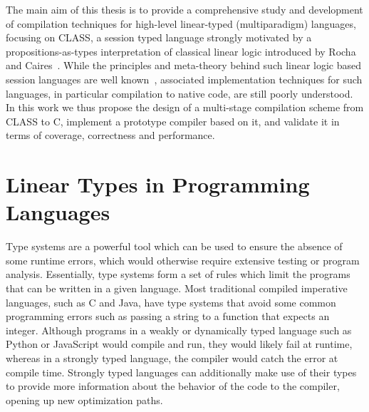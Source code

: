 \label{chap:intro}

The main aim of this thesis is to provide a comprehensive study and development of compilation techniques for high-level linear-typed (multiparadigm) languages, focusing on CLASS, a session typed language strongly motivated by a propositions-as-types interpretation of classical linear logic introduced by Rocha and Caires~\cite{Rocha:2021,Rocha:2023,Rocha:2022}. While the principles and meta-theory behind such linear logic based session languages are well known~\cite{Caires:2016,Wadler:2012}, associated implementation techniques for such languages, in particular compilation to native code, are still poorly understood. In this work we thus propose the design of a multi-stage compilation scheme from CLASS to C, implement a prototype compiler based on it, and validate it in terms of coverage, correctness and performance. 



\section{Linear Types in Programming Languages}

Type systems are a powerful tool which can be used to ensure the absence of some runtime errors, which would otherwise require extensive testing or program analysis. Essentially, type systems form a set of rules which limit the programs that can be written in a given language. Most traditional compiled imperative languages, such as C and Java, have type systems that avoid some common programming errors such as passing a string to a function that expects an integer. Although programs in a weakly or dynamically typed language such as Python or JavaScript would compile and run, they would likely fail at runtime, whereas in a strongly typed language, the compiler would catch the error at compile time. Strongly typed languages can additionally make use of their types to provide more information about the behavior of the code to the compiler, opening up new optimization paths.


